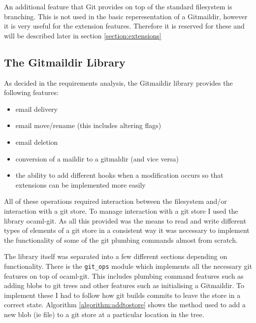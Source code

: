 An additional feature that Git provides on top of the standard filesystem is branching. This is not used in the basic reperesentation of a Gitmaildir, however it is very useful for the extension features. Therefore it is reserved for these and will be described later in section \ref{section:extensions} 

\subsection{The Gitmaildir Library}

As decided in the requirements analysis, the Gitmaildir library provides the following features:

\begin{itemize}
\item email delivery
\item email move/rename (this includes altering flags)
\item email deletion
\item conversion of a maildir to a gitmaldir (and vice versa)
\item the ability to add different hooks when a modification occurs so that extensions can be implemented more easily
\end{itemize}

All of these operations required interaction between the filesystem and/or interaction with a git store. To manage interaction with a git store I used the library ocaml-git. As all this provided was the means to read and write different types of elements of a git store in a consistent way it was necessary to implement the functionality of some of the git plumbing commands almost from scratch.

The library itself was separated into a few different sections depending on functionality. There is the \texttt{git\_ops} module which implements all the necessary git features on top of ocaml-git. This includes plumbing command features such as adding blobs to git trees and other features such as initialising a Gitmaildir. To implement these I had to follow how git builds commits to leave the store in a correct state. Algorithm \ref{algorithm:addtostore} shows the method used to add a new blob (ie file) to a git store at a particular location in the tree.

